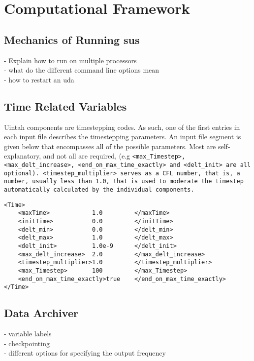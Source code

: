 \section{Computational Framework} \label{Sec:UCF}

\subsection{Mechanics of Running sus}
 - Explain how to run on multiple processors\\
 - what do the different command line options mean\\
 - how to restart an uda\\
 
\subsection{Time Related Variables} \label{Sec:TimeRelatedVariables}
Uintah components are timestepping codes.  As such, one of the first entries
in each input file describes the timestepping parameters.  An input file
segment is given below that encompasses all of the possible parameters.
Most are self-explanatory, and not all are required,
(e.g \tt <max\_Timestep>,
<max\_delt\_increase>, <end\_on\_max\_time\_exactly> \normalfont and
\tt <delt\_init> \normalfont are all optional).
\tt <timestep\_multiplier> \normalfont serves
as a CFL number, that is, a number, usually less than 1.0, that is used to
moderate the timestep automatically calculated by the individual components. 

\begin{Verbatim}[fontsize=\footnotesize]
<Time>
    <maxTime>            1.0         </maxTime>
    <initTime>           0.0         </initTime>
    <delt_min>           0.0         </delt_min>
    <delt_max>           1.0         </delt_max>
    <delt_init>          1.0e-9      </delt_init>
    <max_delt_increase>  2.0         </max_delt_increase>
    <timestep_multiplier>1.0         </timestep_multiplier>
    <max_Timestep>       100         </max_Timestep>
    <end_on_max_time_exactly>true    </end_on_max_time_exactly>
</Time>

\end{Verbatim}
%
\subsection{Data Archiver} \label{Sec:DataArchiver}
- variable labels\\
- checkpointing \\
- different options for specifying the output frequency\\
%
